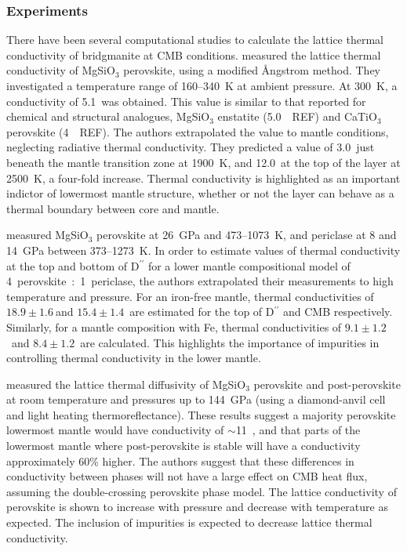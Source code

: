 \subsubsection{Experiments}

There have been several computational studies to calculate the lattice thermal conductivity of bridgmanite at CMB conditions. \citet{Osako1991} measured the lattice thermal conductivity of MgSiO$_3$ perovskite, using a modified \AA ngstrom method. They investigated a temperature range of 160--340~K at ambient pressure. At 300~K, a conductivity of 5.1~\wmks was obtained. This value is similar to that reported for chemical and structural analogues, MgSiO$_3$ enstatite (5.0~\wmk~REF) and CaTiO$_{3}$ perovskite (4~\wmk~REF). The authors extrapolated the value to mantle conditions, neglecting radiative thermal conductivity. They predicted a value of 3.0~\wmks just beneath the mantle transition zone at 1900~K, and 12.0~\wmks at the top of the \ddds layer at 2500~K, a four-fold increase. Thermal conductivity is highlighted as an important indictor of lowermost mantle structure, whether or not the \ddds layer can behave as a thermal boundary between core and mantle.

\citet{Manthilake2011} measured MgSiO$_3$ perovskite at 26~GPa and 473--1073~K, and periclase at 8 and 14~GPa between 373--1273~K. In order to estimate values of thermal conductivity at the top and bottom of D$^{\prime \prime}$ for a lower mantle compositional model of 4~perovskite~:~1~periclase, the authors extrapolated their measurements to high temperature and pressure. For an iron-free mantle, thermal conductivities of $18.9\pm1.6~$\wmks and $15.4\pm1.4$~\wmks are estimated for the top of D$^{\prime \prime}$ and CMB respectively. Similarly, for a mantle composition with Fe, thermal conductivities of $9.1\pm1.2$~\wmks and $8.4\pm1.2$~\wmks are calculated. This highlights the importance of impurities in controlling thermal conductivity in the lower mantle.

\citet{Ohta2012} measured the lattice thermal diffusivity of MgSiO$_3$ perovskite and post-perovskite at room temperature and pressures up to 144~GPa (using a diamond-anvil cell and light heating thermoreflectance). These results suggest a majority perovskite lowermost mantle would have conductivity of $\sim$11~\wmk, and that parts of the lowermost mantle where post-perovskite is stable will have a conductivity approximately 60\% higher. The authors suggest that these differences in conductivity between phases will not have a large effect on CMB heat flux, assuming the double-crossing perovskite phase model. The lattice conductivity of \mgsios perovskite is shown to increase with pressure and decrease with temperature as expected. The inclusion of impurities is expected to decrease lattice thermal conductivity.

